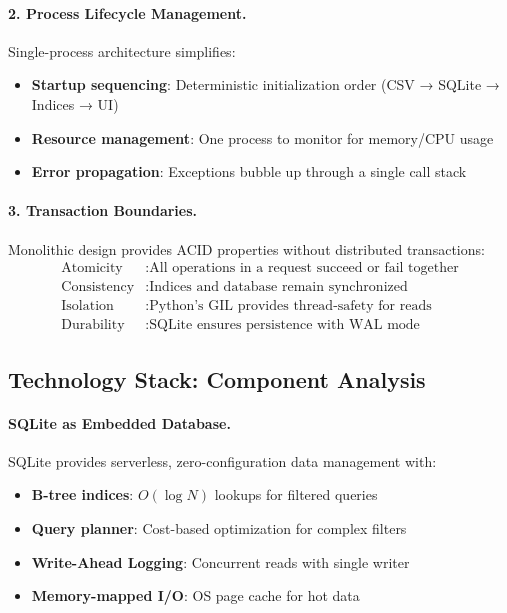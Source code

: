 \paragraph{2. Process Lifecycle Management.} Single-process architecture simplifies:
\begin{itemize}[leftmargin=*,itemsep=2pt,topsep=2pt]
 \item \textbf{Startup sequencing}: Deterministic initialization order (CSV → SQLite → Indices → UI)
 \item \textbf{Resource management}: One process to monitor for memory/CPU usage
 \item \textbf{Error propagation}: Exceptions bubble up through a single call stack
\end{itemize}

\paragraph{3. Transaction Boundaries.} Monolithic design provides ACID properties without distributed transactions:
\begin{align}
\text{Atomicity} &: \text{All operations in a request succeed or fail together} \\
\text{Consistency} &: \text{Indices and database remain synchronized} \\
\text{Isolation} &: \text{Python's GIL provides thread-safety for reads} \\
\text{Durability} &: \text{SQLite ensures persistence with WAL mode}
\end{align}

\subsection{Technology Stack: Component Analysis}

\paragraph{SQLite as Embedded Database.} SQLite \cite{sqlite2020} provides serverless, zero-configuration data management with:
\begin{itemize}[leftmargin=*,itemsep=2pt,topsep=2pt]
 \item \textbf{B-tree indices}: $O(\log N)$ lookups for filtered queries
 \item \textbf{Query planner}: Cost-based optimization for complex filters
 \item \textbf{Write-Ahead Logging}: Concurrent reads with single writer
 \item \textbf{Memory-mapped I/O}: OS page cache for hot data
\end{itemize}

